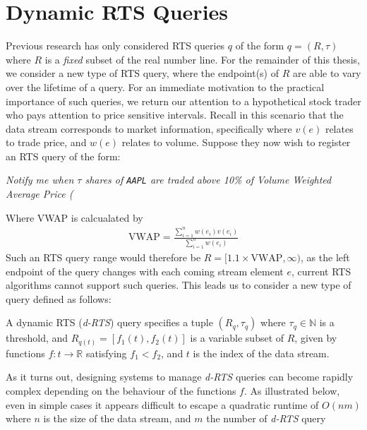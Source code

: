 \section{Dynamic RTS Queries}

Previous research has only considered RTS queries $q$ of the form $q = (R, \tau)$ where $R$ is a \textit{fixed} subset of the real number line. For the remainder of this thesis, we consider a new type of RTS query, where the endpoint(s) of $R$ are able to vary over the lifetime of a query. For an immediate motivation to the practical importance of such queries, we return our attention to a hypothetical stock trader who pays attention to price sensitive intervals. Recall in this scenario that the data stream corresponds to market information, specifically where $v(e)$ relates to trade price, and $w(e)$ relates to volume. Suppose they now wish to register an RTS query of the form: 
\begin{center}
    \textit{Notify me when $\tau$ shares of \texttt{AAPL} are traded above 10\% of Volume Weighted Average Price (}
\end{center}
Where VWAP is calcualated by 
\begin{align}
    \text{VWAP} = \frac{\sum_{i=1}^{n} w(e_i)v(e_i)}{\sum_{i=1}^{n}w(e_i)}
\end{align}
Such an RTS query range would therefore be $R = [1.1\times\text{VWAP}, \infty)$, as the left endpoint of the query changes with each coming stream element $e$, current RTS algorithms cannot support such queries. This leads us to consider a new type of query defined as follows:

\begin{definition} A dynamic RTS (\textit{d-RTS}) query specifies a tuple $(R_q, \tau_q)$ where $\tau_q \in \mathbb{N}$
    is a threshold, and $R_{q(t)} =[f_1(t), f_2(t)]$ is a variable subset of $R$, given by functions $f: t\rightarrow\mathbb{R}$ satisfying $f_1 < f_2$, and $t$ is the index of the data stream.
\end{definition}

As it turns out, designing systems to manage \textit{d-RTS} queries can become rapidly complex depending on the behaviour of the functions $f$. As illustrated below, even in simple cases it appears difficult to escape a quadratic runtime of $O(nm)$ where $n$ is the size of the data stream, and $m$ the number of \textit{d-RTS} query

